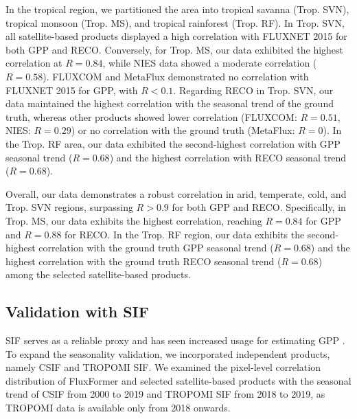 In the tropical region, we partitioned the area into tropical savanna (Trop. SVN), tropical monsoon (Trop. MS), and tropical rainforest (Trop. RF). In Trop. SVN, all satellite-based products displayed a high correlation with FLUXNET 2015 for both GPP and RECO. Conversely, for Trop. MS, our data exhibited the highest correlation at $R=0.84$, while NIES data showed a moderate correlation ($R=0.58$). FLUXCOM and MetaFlux demonstrated no correlation with FLUXNET 2015 for GPP, with $R<0.1$. Regarding RECO in Trop. SVN, our data maintained the highest correlation with the seasonal trend of the ground truth, whereas other products showed lower correlation (FLUXCOM: $R=0.51$, NIES: $R=0.29$) or no correlation with the ground truth (MetaFlux: $R=0$). In the Trop. RF area, our data exhibited the second-highest correlation with GPP seasonal trend ($R=0.68$) and the highest correlation with RECO seasonal trend ($R=0.68$).\par
Overall, our data demonstrates a robust correlation in arid, temperate, cold, and Trop. SVN regions, surpassing $R> 0.9$ for both GPP and RECO. Specifically, in Trop. MS, our data exhibits the highest correlation, reaching $R=0.84$ for GPP and $R=0.88$ for RECO. In the Trop. RF region, our data exhibits the second-highest correlation with the ground truth GPP seasonal trend ($R=0.68$) and the highest correlation with the ground truth RECO seasonal trend ($R=0.68$) among the selected satellite-based products. \par


\subsection{Validation with SIF}
SIF serves as a reliable proxy and has seen increased usage for estimating GPP \citep{norton2019estimating, liu2020improving, bai2022estimation}. To expand the seasonality validation, we incorporated independent products, namely CSIF and TROPOMI SIF. We examined the pixel-level correlation distribution of FluxFormer and selected satellite-based products with the seasonal trend of CSIF from 2000 to 2019 and TROPOMI SIF from 2018 to 2019, as TROPOMI data is available only from 2018 onwards.\par

